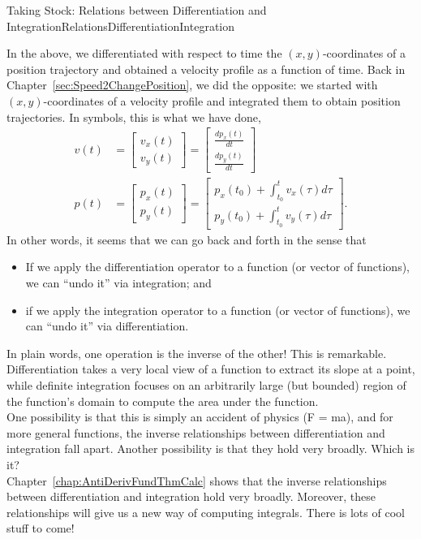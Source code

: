 \begin{funColor}{Taking Stock: Relations between Differentiation and Integration}{RelationsDifferentiationIntegration}

In the above, we differentiated with respect to time the $(x,y)$-coordinates of a position trajectory and obtained a velocity profile as a function of time. Back in Chapter~\ref{sec:Speed2ChangePosition}, we did the opposite: we started with $(x,y)$-coordinates of a velocity profile and integrated them to obtain position trajectories.  In symbols, this is what we have done,
\begin{equation}
\label{eq:RelationsDifferentiationIntegration}
\begin{aligned}
 v(t) &= \begin{bmatrix} v_x(t) \\ v_y(t) \end{bmatrix} = \begin{bmatrix} \frac{d p_x(t)}{dt} \\ \frac{d p_y(t)}{dt} \end{bmatrix} \\[1em]  
    p(t) &= \begin{bmatrix} p_x(t) \\ p_y(t) \end{bmatrix} = 
    \begin{bmatrix} p_x(t_0) +  \int_{t_0}^t v_x(\tau) d\tau\\[0.5em]  
    p_y(t_0) + \int_{t_0}^t v_y(\tau) d\tau\end{bmatrix}.   
\end{aligned}    
\end{equation}
In other words, it seems that we can go back and forth in the sense that
\begin{itemize}
    \item If we apply the differentiation operator to a function (or vector of functions), we can ``undo it'' via integration; and 
    \item if we apply the integration operator to a function (or vector of functions), we can ``undo it'' via differentiation.
\end{itemize}
In plain words, one operation is the inverse of the other! This is remarkable. Differentiation takes a very local view of a function to extract its slope at a point, while definite integration focuses on an arbitrarily large (but bounded) region of the function's domain to compute the area under the function. \\

One possibility is that this is simply an accident of physics (F = ma), and for more general functions, the inverse relationships between differentiation and integration fall apart. Another possibility is that they hold very broadly. Which is it?\\

Chapter~\ref{chap:AntiDerivFundThmCalc} shows that the inverse relationships between differentiation and integration hold very broadly. Moreover, these relationships will give us a new way of computing integrals. There is lots of cool stuff to come!    
\end{funColor}

